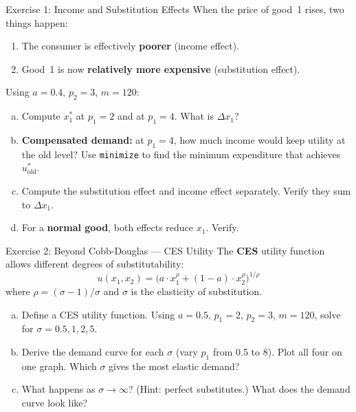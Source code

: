 \documentclass[aspectratio=169, 10pt]{beamer}
\begin{document}
\begin{frame}{Exercise 1: Income and Substitution Effects}
When the price of good~1 rises, two things happen:
\vspace{0.3em}
\begin{enumerate}
  \item The consumer is effectively \textbf{poorer} (income effect).
  \item Good~1 is now \textbf{relatively more expensive} (substitution effect).
\end{enumerate}
\vspace{0.5em}
Using $a = 0.4$, $p_2 = 3$, $m = 120$:
\vspace{0.3em}
\begin{enumerate}[(a)]
  \item Compute $x_1^*$ at $p_1 = 2$ and at $p_1 = 4$. What is $\Delta x_1$?
  \item \textbf{Compensated demand:} at $p_1 = 4$, how much income would keep
        utility at the old level? Use \texttt{minimize} to find the minimum
        expenditure that achieves $u^*_{\text{old}}$.
  \item Compute the substitution effect and income effect separately.
        Verify they sum to $\Delta x_1$.
  \item For a \textbf{normal good}, both effects reduce $x_1$. Verify.
\end{enumerate}
\end{frame}

\begin{frame}{Exercise 2: Beyond Cobb-Douglas --- CES Utility}
The \textbf{CES} utility function allows different degrees of substitutability:
\[
  u(x_1, x_2) = \bigl( a \cdot x_1^\rho + (1-a) \cdot x_2^\rho \bigr)^{1/\rho}
\]
where $\rho = (\sigma - 1)/\sigma$ and $\sigma$ is the elasticity of substitution.
\vspace{0.5em}
\begin{enumerate}[(a)]
  \item Define a CES utility function. Using $a = 0.5$, $p_1 = 2$, $p_2 = 3$,
        $m = 120$, solve for $\sigma = 0.5, 1, 2, 5$.
  \item Derive the demand curve for each $\sigma$ (vary $p_1$ from 0.5 to 8).
        Plot all four on one graph. Which $\sigma$ gives the most elastic demand?
  \item What happens as $\sigma \to \infty$? (Hint: perfect substitutes.)
        What does the demand curve look like?
\end{enumerate}
\end{frame}
\end{document}
